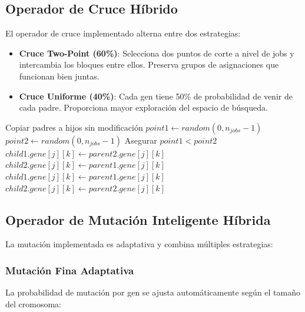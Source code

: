 \documentclass[preprint,12pt,authoryear]{elsarticle}
\begin{document}
\subsection{Operador de Cruce Híbrido}

El operador de cruce implementado alterna entre dos estrategias:

\begin{itemize}
    \item \textbf{Cruce Two-Point (60\%)}: Selecciona dos puntos de corte a nivel de jobs y intercambia los bloques entre ellos. Preserva grupos de asignaciones que funcionan bien juntas.
    
    \item \textbf{Cruce Uniforme (40\%)}: Cada gen tiene 50\% de probabilidad de venir de cada padre. Proporciona mayor exploración del espacio de búsqueda.
\end{itemize}

\begin{algorithm}[h]
\caption{Cruce Two-Point por Jobs}
\begin{algorithmic}[1]
    \STATE Copiar padres a hijos sin modificación
    \RETURN
\ENDIF
\STATE $point1 \leftarrow random(0, n_{jobs}-1)$
\STATE $point2 \leftarrow random(0, n_{jobs}-1)$
\STATE Asegurar $point1 < point2$
            \STATE $child1.gene[j][k] \leftarrow parent2.gene[j][k]$
            \STATE $child2.gene[j][k] \leftarrow parent1.gene[j][k]$
        \ELSE
            \STATE $child1.gene[j][k] \leftarrow parent1.gene[j][k]$
            \STATE $child2.gene[j][k] \leftarrow parent2.gene[j][k]$
        \ENDIF
    \ENDFOR
\ENDFOR
\end{algorithmic}
\end{algorithm}

\subsection{Operador de Mutación Inteligente Híbrida}

La mutación implementada es adaptativa y combina múltiples estrategias:

\subsubsection{Mutación Fina Adaptativa}
La probabilidad de mutación por gen se ajusta automáticamente según el tamaño del cromosoma:
\end{document}
